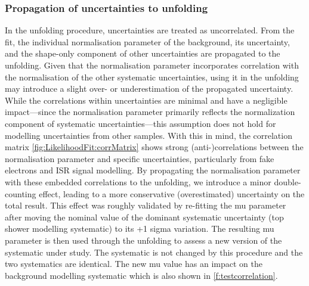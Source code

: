 \subsubsection{Propagation of uncertainties to unfolding}
In the unfolding procedure, uncertainties are treated as uncorrelated. From the fit, the individual normalisation parameter of the \Wjets background, its uncertainty, and the shape-only component of other \Wjets uncertainties are propagated to the unfolding.
Given that the normalisation parameter incorporates correlation with the normalisation of the other systematic uncertainties, using it in the unfolding may introduce a slight over- or underestimation of the propagated uncertainty. While the correlations within \Wjets uncertainties are minimal and have a negligible impact—since the normalisation parameter primarily reflects the normalization component of \Wjets systematic uncertainties—this assumption does not hold for modelling uncertainties from other samples.
With this in mind, the correlation matrix \cref{fig:LikelihoodFit:corrMatrix} shows strong (anti-)correlations between the \Wjets normalisation parameter and specific uncertainties, particularly from fake electrons and ISR signal modelling. By propagating the normalisation parameter with these embedded correlations to the unfolding, we introduce a minor double-counting effect, leading to a more conservative (overestimated) uncertainty on the total result. %
This effect was roughly validated by re-fitting the mu \Wjets parameter after moving the nominal value of the dominant systematic uncertainty (top shower modelling systematic) to its +1 sigma variation. The resulting mu parameter is then used through the unfolding to assess a new version of the systematic under study. The systematic is not changed by this procedure and the two systematics are identical. The new mu value has an impact on the \Wjets background modelling systematic which is also shown in \cref{f:testcorrelation}. 



